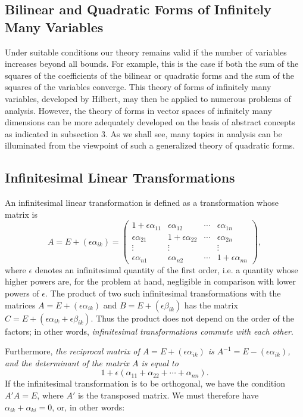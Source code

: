 \subsection{Bilinear and Quadratic Forms of Infinitely Many Variables}
Under suitable conditions our theory remains valid if the number of variables increases beyond all bounds. For example, this is the case if both the sum of the squares of the coefficients of the bilinear or quadratic forms and the sum of the squares of the variables converge. This theory of forms of infinitely many variables, developed by Hilbert, may then be applied to numerous problems of analysis. However, the theory of forms in vector spaces of infinitely many dimensions can be more adequately developed on the basis of abstract concepts as indicated in subsection 3. As we shall see, many topics in analysis can be illuminated from the viewpoint of such a generalized theory of quadratic forms.

\subsection{Infinitesimal Linear Transformations}
An infinitesimal linear transformation is defined as a transformation whose matrix is
\[
A=E+(\epsilon\alpha_{ik})=
\begin{pmatrix}
1+\epsilon\alpha_{11}&\epsilon\alpha_{12}&\cdots&\epsilon\alpha_{1n}\\
\epsilon\alpha_{21}&1+\epsilon\alpha_{22}&\cdots&\epsilon\alpha_{2n}\\
\vdots&\vdots&&\vdots\\
\epsilon\alpha_{n1}&\epsilon\alpha_{n2}&\cdots&1+\epsilon\alpha_{nn}
\end{pmatrix},
\]
where $\epsilon$ denotes an infinitesimal quantity of the first order, i.e. a quantity whose higher powers are, for the problem at hand, negligible in comparison with lower powers of $\epsilon$. The product of two such infinitesimal transformations with the matrices $A=E+(\epsilon\alpha_{ik})$ and $B=E+(\epsilon\beta_{ik})$ has the matrix $C=E+(\epsilon\alpha_{ik}+\epsilon\beta_{ik})$. Thus the product does not depend on the order of the factors; in other words, \emph{infinitesimal transformations commute with each other}.

Furthermore, \emph{the reciprocal matrix of $A=E+(\epsilon\alpha_{ik})$ is $A^{-1}=E-(\epsilon\alpha_{ik})$, and the determinant of the matrix $A$ is equal to}
\[1+\epsilon(\alpha_{11}+\alpha_{22}+\cdots+\alpha_{nn}).\]
If the infinitesimal transformation is to be orthogonal, we have the condition $A'A=E$, where $A'$ is the transposed matrix. We must therefore have $\alpha_{ik}+\alpha_{ki}=0$, or, in other words:

